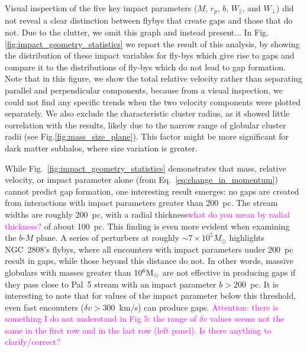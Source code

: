 \documentclass[draft]{aa}
\newcommand{\paola}[1]{\textcolor{magenta}{{#1}}}
\begin{document}
    Visual inspection of the five key impact parameters ($M$, $r_p$, $b$, $W_\parallel$, and $W_\perp$) did not reveal a clear distinction between flybys that create gaps and those that do not. Due to the clutter, we omit this graph and instead present... In Fig.\ref{fig:impact_geometry_statistics} we report the result of this analysis, by showing the distribution of these impact variables for fly-bys which give rise to gaps and compare it to the distributions of fly-bys which do not lead to gap formation. Note that in this figure, we show the total relative velocity rather than separating parallel and perpendicular components, because from a visual inspection, we could not find any specific trends when the two velocity components were plotted separately. We also exclude the characteristic cluster radius, as it showed little correlation with the results, likely due to the narrow range of globular cluster radii (see Fig.\ref{fig:mass_size_plane}). This factor might be more significant for dark matter subhalos, where size variation is greater.
      
      
  
    While Fig.~\ref{fig:impact_geometry_statistics} demonstrates that mass, relative velocity, or impact parameter alone (from Eq.~\ref{eq:change_in_momentum}) cannot predict gap formation, one interesting result emerges: no gaps are created from interactions with impact parameters greater than 200~pc. The stream widths are roughly 200~pc, with a radial thickness\paola{what do you mean by radial thickness?} of about 100~pc. This finding is even more evident when examining the $b$-$M$ plane. A series of perturbers at roughly $\sim7 \times 10^5 M_\odot$ highlights NGC~2808's flybys, where all encounters with impact parameters under 200~pc result in gaps, while those beyond this distance do not. In other words, massive globulars with masses greater than $10^6 \rm{M}_\odot$ are not effective in producing gaps if they pass close to Pal~5 stream with an impact parameter $b > 200$~pc. It is interesting to note that for values of the impact parameter below this threshold, even fast encounters ($\delta v > 300$~km/s) can produce gaps. \paola{Attention: there is something I do not understand in Fig 5: the range of $\delta v$ values seems not the same in the first row and in the last row (left panel). Is there anything to clarify/correct?}
\end{document}
